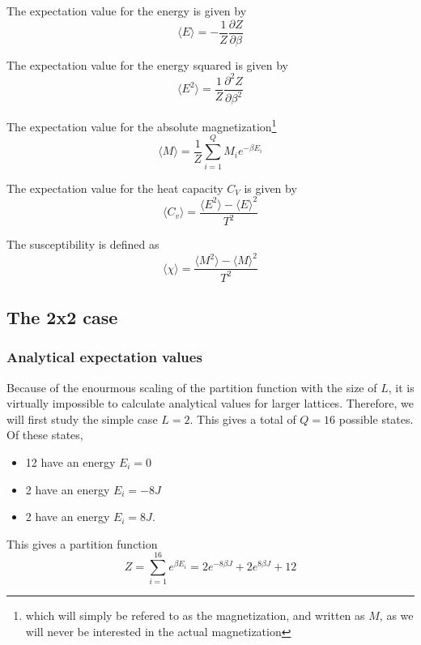 \documentclass[10pt,a4paper]{article}
\begin{document}
The expectation value for the energy is given by
\begin{equation}\label{eqn:energy}
\langle E \rangle = -\frac{1}{Z}\frac{\partial Z}{\partial\beta}
\end{equation}

The expectation value for the energy squared is given by
\begin{equation}
\langle E^2 \rangle = \frac{1}{Z}\frac{\partial^2 Z}{\partial\beta^2}
\end{equation}

The expectation value for the absolute magnetization\footnote{which will simply be refered to as the magnetization, and written as $M$, as we will never be interested in the actual magnetization}
\begin{equation}
\langle M \rangle = \frac{1}{Z} \sum\limits_{i=1}^Q M_i e^{-\beta E_i}
\end{equation}

The expectation value for the heat capacity $C_V$ is given by
\begin{equation}
\langle C_v \rangle = \frac{\langle E^2 \rangle - \langle E \rangle ^2}{T^2}
\end{equation}

The susceptibility is defined as
\begin{equation}
\langle \chi \rangle = \frac{\langle M^2 \rangle - \langle M \rangle ^2}{T^2}
\end{equation}


\subsection{The 2x2 case}
\subsubsection{Analytical expectation values}
Because of the enourmous scaling of the partition function with the size of $L$, it is virtually impossible to calculate analytical values for larger lattices. Therefore, we will first study the simple case $L = 2$. This gives a total of $Q = 16$ possible states. Of these states,
\begin{itemize}
\item 12 have an energy $E_i = 0$
\item 2 have an energy $E_i = -8J$
\item 2 have an energy $E_i = 8J$.
\end{itemize}
This gives a partition function
\begin{equation}
Z = \sum\limits_{i=1}^16 e^{\beta E_i} = 2e^{-8\beta J} + 2e^{8\beta J} + 12
\end{equation}
\end{document}
